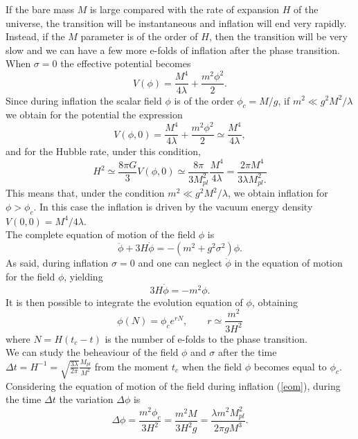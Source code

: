 \documentclass[11pt,a4paper,twoside]{book}
\begin{document}
 If the bare mass $ M $ is large compared with the rate of expansion $H$ of the universe, the transition will be instantaneous and inflation will end very rapidly. Instead, if the $ M $ parameter is of the order of $ H $, then the transition will be very slow and we can have a few more e-folds of inflation after the phase transition. When $ \sigma=0 $ the effective potential becomes
 \begin{equation}
 \label{effectivePotential}
 V(\phi)=\frac{M^{4}}{4\lambda} +  \frac{m^{2} \phi^{2}}{2}.
 \end{equation}
Since during inflation the scalar field $\phi$ is of the order $\phi_{c}=M/g$, if $ m^{2} \ll g^{2}M^{2}/\lambda $ we obtain for the potential the expression
\begin{equation}
	\label{potential}
	V(\phi,0)=\frac{M^{4}}{4\lambda} +  \frac{m^{2} \phi^{2}}{2} \simeq \frac{M^{4}}{4\lambda},
\end{equation} 
and for the Hubble rate, under this condition,
\begin{equation}
	\label{Chap2:HubbleHybrid}
	H^{2}\simeq\frac{8\pi G}{3} V(\phi,0) \simeq \frac{8\pi }{3M_{pl}^{2}}\frac{M^{4}}{4\lambda} =\frac{2\pi M^{4}}{3\lambda M_{pl}^{2}.}
\end{equation}
This means that, under the condition $  m^{2} \ll g^{2}M^{2}/\lambda $, we obtain inflation for $ \phi > \phi_{c} $. In this case the inflation is driven by the vacuum energy density $ V(0,0) = M^{4}/4\lambda $.\\
The complete equation of motion of the field $\phi$ is
\begin{equation}
	\ddot{\phi} + 3H\dot{\phi}=-(m^{2} + g^{2}\sigma^{2})\phi.
\end{equation}
As said, during inflation $\sigma=0$ and one can neglect $\ddot{\phi}$ in the equation of motion for the field $\phi$, yielding
\begin{equation}
	\label{eom}
	3H\dot{\phi}=-m^{2}\phi.
\end{equation}
It is then possible to integrate the evolution equation of $\phi$, obtaining
\begin{equation}	
	\label{Chap2:solutionField}
	\phi(N)=\phi_{c}e^{rN}, \qquad r\simeq \frac{m^{2}}{3H^{2}}
\end{equation}
where $ N=H(t_{c}-t) $ is the number of e-folds to the phase transition.\\
We can study the beheaviour of the field $\phi$ and $\sigma$ after the time 
$ \Delta t = H^{-1}=\sqrt{\frac{3\lambda}{2\pi}}\frac{M_{pl}}{M^{2}} $ from the moment $ t_{c} $ when the field $\phi$ becomes equal to $\phi_{c}$.
Considering the equation of motion of the field during inflation (\ref{eom}), during the time $\Delta t$ the variation $\Delta \phi$ is
\begin{equation}
	\label{Chap2:variationDeltaPhi}
	\Delta \phi = \frac{m^{2} \phi_{c}}{3H^{2}} = \frac{m^{2}M}{3H^{2}g} = \frac{\lambda m^{2}M_{pl}^{2}}{2\pi gM^{3}}.
\end{equation}
\end{document}
